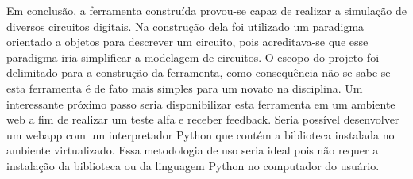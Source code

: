 Em conclusão, a ferramenta construída provou-se capaz de realizar a simulação de diversos circuitos digitais.
Na construção dela foi utilizado um paradigma orientado a objetos para descrever um circuito, pois acreditava-se que esse paradigma iria simplificar a modelagem de circuitos.
O escopo do projeto foi delimitado para a construção da ferramenta, como consequência não se sabe se esta ferramenta é de fato mais simples para um novato na disciplina.
Um interessante próximo passo seria disponibilizar esta ferramenta em um ambiente web a fim de realizar um teste alfa e receber feedback.
Seria possível desenvolver um webapp com um interpretador Python que contém a biblioteca instalada no ambiente virtualizado.
Essa metodologia de uso seria ideal pois não requer a instalação da biblioteca ou da linguagem Python no computador do usuário.

